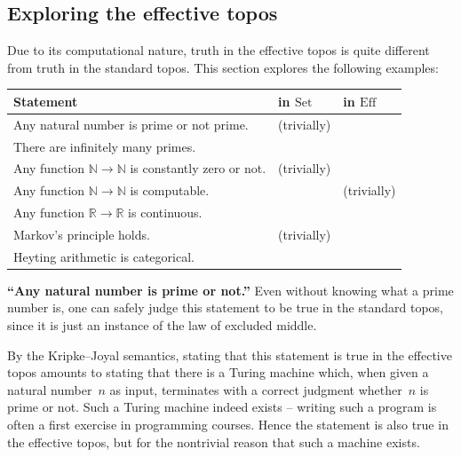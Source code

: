 \documentclass[oneside,reqno]{amsart}
\newcommand{\cmark}{\ding{51}}
\newcommand{\xmark}{\ding{55}}
\theoremstyle{definition}
\theoremstyle{plain}
\theoremstyle{remark}
\newcommand{\NN}{\mathbb{N}}
\newcommand{\RR}{\mathbb{R}}
\newcommand{\Set}{\mathrm{Set}}
\newcommand{\Eff}{\mathrm{Ef{}f}}
\renewcommand{\_}{\mathpunct{.}\,}
\newcommand{\effective}{ef{}fective\xspace}
\newcommand{\?}{\,{:}\,}
\begin{document}


\subsection{Exploring the \effective topos}
\label{sect:eff-examples}
Due to its computational nature, truth in the \effective topos is quite
different from truth in the standard topos. This section explores the following
examples:

\bigskip
\begin{center}
\begin{tabular}{lll}
  \toprule
  Statement & in $\Set$ & in $\Eff$ \\
  \midrule
  Any natural number is prime or not prime. & \cmark{} (trivially) & \cmark \\
  There are infinitely many primes. & \cmark & \cmark \\
  Any function $\NN \to \NN$ is constantly zero or not. & \cmark{} (trivially) & \xmark \\
  Any function $\NN \to \NN$ is computable. & \xmark & \cmark{} (trivially) \\
  Any function $\RR \to \RR$ is continuous. & \xmark & \cmark \\
  Markov's principle holds. & \cmark{} (trivially) & \cmark \\
  Heyting arithmetic is categorical. & \xmark & \cmark \\
  \bottomrule
\end{tabular}
\end{center}

\newcommand{\dotparagraph}[1]{\noindent\textbf{#1}}

\bigskip
\dotparagraph{``Any natural number is prime or not.''} Even without knowing what
a prime number is, one can safely judge this statement to be true in
the standard topos, since it is just an instance of the law of excluded middle.

By the Kripke--Joyal semantics, stating that this statement is true in the \effective topos
amounts to stating that there is a Turing machine which, when given a natural
number~$n$ as input, terminates with a correct judgment whether~$n$ is prime or
not. Such a Turing machine indeed exists -- writing such a program is often a
first exercise in programming courses. Hence the statement is also true in the
\effective topos, but for the nontrivial reason that such a machine exists.
\end{document}

